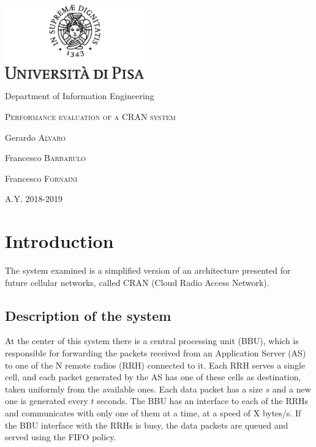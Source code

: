 \documentclass[11pt,a4paper,oneside, openright]{article}
\begin{document}
{
  \begin{titlepage}
  	\centering
  	\includegraphics[width=6cm]{images/unipi.eps}\par
    \vspace{1.5cm}
    {\Large Department of Information Engineering \par}
  	\vspace{1.5cm}
  	{\huge\textsc{Performance evaluation of a CRAN system}\par}
  	\vspace{2cm}
  	Gerardo \textsc{Alvaro}\par
  	Francesco \textsc{Barbarulo}\par
    Francesco \textsc{Fornaini}

  	\vfill

  	{\large A.Y. 2018-2019\par}
  \end{titlepage}
}


\tableofcontents

\newpage

\section{Introduction}
\label{sec:introduction}

The system examined is a simplified version of an architecture presented for future cellular networks, called CRAN (Cloud Radio Access Network).

\subsection{Description of the system}
 At the center of this system there is a central processing unit (BBU), which is responsible for forwarding the packets received from an Application Server (AS) to one of the N remote radios (RRH) connected to it. Each RRH serves a single cell, and each packet generated by the AS has one of these cells as destination, taken uniformly from the available ones. Each data packet has a size $s$ and a new one is generated every $t$ seconds. The BBU has an interface to each of the RRHs and communicates with only one of them at a time, at a speed of X bytes/s. If the BBU interface with the RRHs is busy, the data packets are queued and served using the FIFO policy. 
\end{document}
